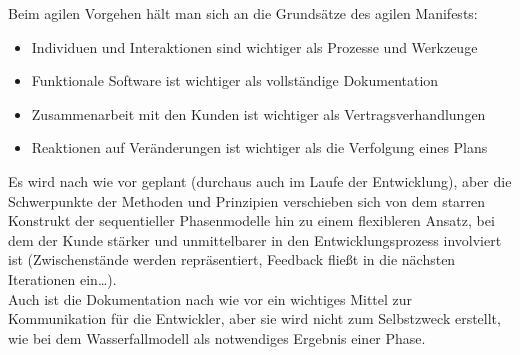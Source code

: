 Beim agilen Vorgehen hält man sich an die Grundsätze des agilen Manifests:

\begin{itemize}
    \item Individuen und Interaktionen sind wichtiger als Prozesse und Werkzeuge
    \item Funktionale Software ist wichtiger als vollständige Dokumentation
    \item Zusammenarbeit mit den Kunden ist wichtiger als Vertragsverhandlungen
    \item Reaktionen auf Veränderungen ist wichtiger als die Verfolgung eines Plans
\end{itemize}

\noindent
Es wird nach wie vor geplant (durchaus auch im Laufe der Entwicklung), aber die Schwerpunkte der Methoden und Prinzipien verschieben sich von dem starren Konstrukt der sequentieller Phasenmodelle hin zu einem flexibleren Ansatz, bei dem der Kunde stärker und unmittelbarer in den Entwicklungsprozess involviert ist (Zwischenstände werden repräsentiert, Feedback fließt in die nächsten Iterationen ein\ldots).\\
Auch ist die Dokumentation nach wie vor ein wichtiges Mittel zur Kommunikation für die Entwickler, aber sie wird nicht zum Selbstzweck erstellt, wie bei dem Wasserfallmodell als notwendiges Ergebnis einer Phase.